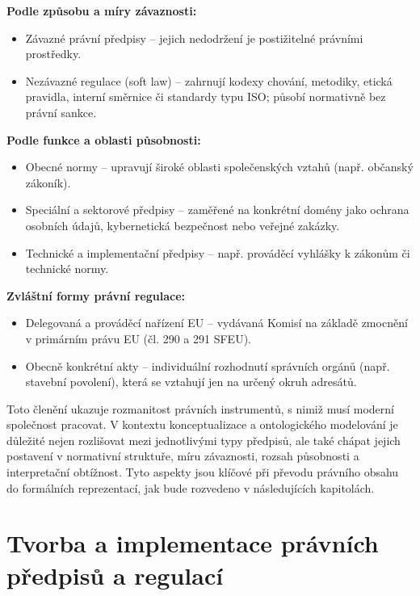 \vspace{1em}
\noindent \textbf{Podle způsobu a míry závaznosti:}
\begin{itemize}
  \item Závazné právní předpisy – jejich nedodržení je postižitelné právními prostředky.
  \item Nezávazné regulace (soft law) – zahrnují kodexy chování, metodiky, etická pravidla, interní směrnice či standardy typu ISO; působí normativně bez právní sankce. \cite{Weinberger2017,Boguszak2001}
\end{itemize}
\vspace{1em}
\noindent \textbf{Podle funkce a oblasti působnosti:}
\begin{itemize}
  \item Obecné normy – upravují široké oblasti společenských vztahů (např. občanský zákoník).
  \item Speciální a sektorové předpisy – zaměřené na konkrétní domény jako ochrana osobních údajů, kybernetická bezpečnost nebo veřejné zakázky.
  \item Technické a implementační předpisy – např. prováděcí vyhlášky k zákonům či technické normy. \cite{Sovova2014}
\end{itemize}
\vspace{1em}
\noindent \textbf{Zvláštní formy právní regulace:}
\begin{itemize}
  \item Delegovaná a prováděcí nařízení EU – vydávaná Komisí na základě zmocnění v primárním právu EU (čl. 290 a 291 SFEU).
  \item Obecně konkrétní akty – individuální rozhodnutí správních orgánů (např. stavební povolení), která se vztahují jen na určený okruh adresátů. \cite{Sovova2014, Boguszak2001}
\end{itemize}

\noindent Toto členění ukazuje rozmanitost právních instrumentů, s nimiž musí moderní společnost pracovat. V kontextu konceptualizace a ontologického modelování je důležité nejen rozlišovat mezi jednotlivými typy předpisů, ale také chápat jejich postavení v normativní struktuře, míru závaznosti, rozsah působnosti a interpretační obtížnost. Tyto aspekty jsou klíčové při převodu právního obsahu do formálních reprezentací, jak bude rozvedeno v následujících kapitolách. 



\section{Tvorba a implementace právních předpisů a regulací}
\label{sec:tvorba-a-implementace}

